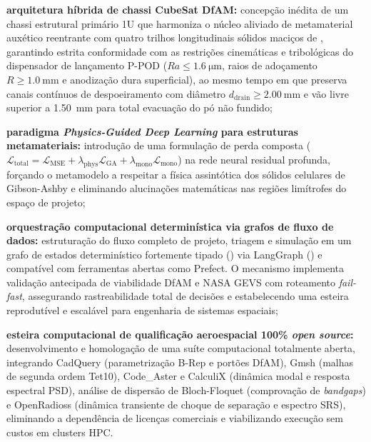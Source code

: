 \begin{alineas}
  \item \textbf{arquitetura híbrida de chassi CubeSat DfAM:} concepção inédita de um chassi estrutural primário 1U que harmoniza o núcleo aliviado de metamaterial auxético reentrante com quatro trilhos longitudinais sólidos maciços de \rail{}, garantindo estrita conformidade com as restrições cinemáticas e tribológicas do dispensador de lançamento P-POD ($Ra \le \SI{1.6}{\micro\metre}$, raios de adoçamento $R \ge \SI{1.0}{\milli\metre}$ e anodização dura superficial), ao mesmo tempo em que preserva canais contínuos de despoeiramento com diâmetro $d_{\text{drain}} \ge \SI{2.00}{\milli\metre}$ e vão livre superior a \SI{1.50}{\milli\metre} para total evacuação do pó não fundido;
  
  \item \textbf{paradigma \textit{Physics-Guided Deep Learning} para estruturas metamateriais:} introdução de uma formulação de perda composta ($\mathcal{L}_{\text{total}} = \mathcal{L}_{\text{MSE}} + \lambda_{\text{phys}}\mathcal{L}_{\text{GA}} + \lambda_{\text{mono}}\mathcal{L}_{\text{mono}}$) na rede neural residual profunda, forçando o metamodelo a respeitar a física assintótica dos sólidos celulares de Gibson-Ashby e eliminando alucinações matemáticas nas regiões limítrofes do espaço de projeto;
  
  \item \textbf{orquestração computacional determinística via grafos de fluxo de dados:} estruturação do fluxo completo de projeto, triagem e simulação em um grafo de estados determinístico fortemente tipado () via LangGraph () e compatível com ferramentas abertas como Prefect. O mecanismo implementa validação antecipada de viabilidade DfAM e NASA GEVS com roteamento \textit{fail-fast}, assegurando rastreabilidade total de decisões e estabelecendo uma esteira reprodutível e escalável para engenharia de sistemas espaciais;
  
  \item \textbf{esteira computacional de qualificação aeroespacial 100\% \textit{open source}:} desenvolvimento e homologação de uma suíte computacional totalmente aberta, integrando CadQuery (parametrização B-Rep e portões DfAM), Gmsh (malhas de segunda ordem Tet10), Code\_Aster e CalculiX (dinâmica modal e resposta espectral PSD), análise de dispersão de Bloch-Floquet (comprovação de \textit{bandgaps}) e OpenRadioss (dinâmica transiente de choque de separação e espectro SRS), eliminando a dependência de licenças comerciais e viabilizando execução sem custos em clusters HPC.
\end{alineas}

